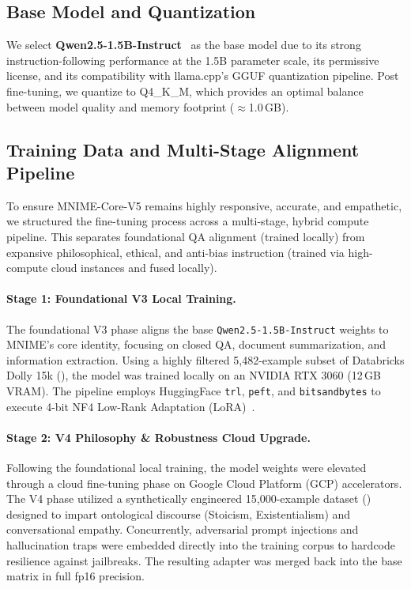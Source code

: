 \documentclass[11pt]{article}
\begin{document}
\subsection{Base Model and Quantization}

We select \textbf{Qwen2.5-1.5B-Instruct}~\cite{qwen2025} as the base model
due to its strong instruction-following performance at the 1.5B parameter scale,
its permissive license, and its compatibility with llama.cpp's GGUF
quantization pipeline.
Post fine-tuning, we quantize to Q4\_K\_M, which provides an optimal balance
between model quality and memory footprint ($\approx$1.0\,GB).

\subsection{Training Data and Multi-Stage Alignment Pipeline}



To ensure MNIME-Core-V5 remains highly responsive, accurate, and empathetic, we structured the fine-tuning process across a multi-stage, hybrid compute pipeline. This separates foundational QA alignment (trained locally) from expansive philosophical, ethical, and anti-bias instruction (trained via high-compute cloud instances and fused locally).

\paragraph{Stage 1: Foundational V3 Local Training.} The foundational V3 phase aligns the base \texttt{Qwen2.5-1.5B-Instruct} weights to MNIME's core identity, focusing on closed QA, document summarization, and information extraction. Using a highly filtered 5,482-example subset of Databricks Dolly 15k (), the model was trained locally on an NVIDIA RTX 3060 (12\,GB VRAM). The pipeline employs HuggingFace \texttt{trl}, \texttt{peft}, and \texttt{bitsandbytes} to execute 4-bit NF4 Low-Rank Adaptation (LoRA)~\cite{hu2021lora}.

\paragraph{Stage 2: V4 Philosophy \& Robustness Cloud Upgrade.} Following the foundational local training, the model weights were elevated through a cloud fine-tuning phase on Google Cloud Platform (GCP) accelerators. The V4 phase utilized a synthetically engineered 15,000-example dataset () designed to impart ontological discourse (Stoicism, Existentialism) and conversational empathy. Concurrently, adversarial prompt injections and hallucination traps were embedded directly into the training corpus to hardcode resilience against jailbreaks. The resulting adapter was merged back into the base matrix in full fp16 precision.
\end{document}
